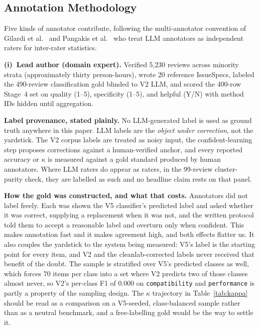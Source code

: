 \documentclass[preprint,12pt]{elsarticle}
\begin{document}
\subsection{Annotation Methodology}
Five kinds of annotator contribute, following the multi-annotator convention of Gilardi et al.~\cite{gilardi2023chatgpt} and Pangakis et al.~\cite{pangakis2023automated} who treat LLM annotators as independent raters for inter-rater statistics.

\textbf{(i)~Lead author (domain expert).} Verified 5{,}230 reviews across minority strata (approximately thirty person-hours), wrote 20 reference IssueSpecs, labeled the 490-review classification gold blinded to V2 LLM, and scored the 400-row Stage~4 set on quality (1--5), specificity (1--5), and helpful (Y/N) with method IDs hidden until aggregation.

\textbf{Label provenance, stated plainly.} No LLM-generated label is used as ground truth
anywhere in this paper. LLM labels are the \emph{object under correction}, not the yardstick.
The V2 corpus labels are treated as noisy input, the confident-learning step proposes
corrections against a human-verified anchor, and every reported accuracy or $\kappa$ is measured
against a gold standard produced by human annotators. Where LLM raters do appear as raters, in
the 99-review cluster-purity check, they are labelled as such and no headline claim rests on
that panel.

\textbf{How the gold was constructed, and what that costs.} Annotators did not label freely.
Each was shown the V5 classifier's predicted label and asked whether it was correct, supplying a
replacement when it was not, and the written protocol told them to accept a reasonable label and
overturn only when confident. This makes annotation fast and it makes agreement high, and both
effects flatter us. It also couples the yardstick to the system being measured: V5's label is the
starting point for every item, and V2 and the cleanlab-corrected labels never received that
benefit of the doubt. The sample is stratified over V5's predicted classes as well, which forces
70 items per class into a set where V2 predicts two of those classes almost never, so V2's
per-class F1 of 0.000 on \texttt{compatibility} and \texttt{performance} is partly a property of
the sampling design. The $\kappa$ trajectory in Table~\ref{tab:kappa} should be read as a
comparison on a V5-seeded, class-balanced sample rather than as a neutral benchmark, and a
free-labelling gold would be the way to settle it.
\end{document}

